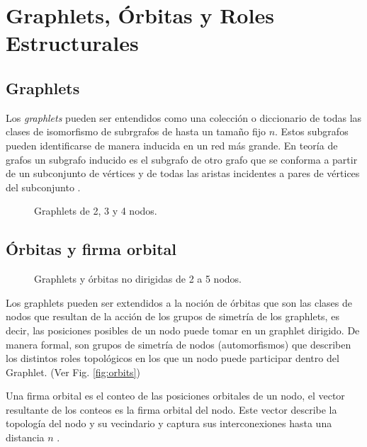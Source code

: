 
\chapter{Graphlets, Órbitas y Roles Estructurales}
\label{chapter:graphlets}

\section{Graphlets}


Los \textit{graphlets} pueden ser entendidos como una colección o diccionario de todas las clases de isomorfismo de subrgrafos de hasta un tamaño fijo $n$. Estos subgrafos pueden identificarse de manera inducida en un red más grande. En teoría de grafos un subgrafo inducido es el subgrafo de otro grafo que se conforma a partir de un subconjunto de vértices y de todas las aristas incidentes a pares de vértices del subconjunto \cite{przulj_biological_2007}.


 \begin{figure}[htbp]
   \centering
   
    \caption{Graphlets de 2, 3 y 4 nodos.}
    \label{fig:small-graphlets}
\end{figure}

\section{Órbitas y firma orbital}

 \begin{figure}[htbp]
   \centering
   
    \caption{Graphlets y órbitas no dirigidas de 2 a 5 nodos.}
    \label{fig:orcaorbits}
\end{figure}

Los graphlets pueden ser extendidos a la noción de órbitas que son las clases de nodos que resultan de la acción de los grupos de simetría de los graphlets, es decir, las posiciones posibles de un nodo puede tomar en un graphlet dirigido. De manera formal, son grupos de simetría de nodos (automorfismos) \cite{sarajlic_graphlet-based_2016} que describen los distintos roles topológicos en los que un nodo puede participar dentro del Graphlet. (Ver Fig. \ref{fig:orbits})

Una firma orbital es el conteo de las posiciones orbitales de un nodo, el vector resultante de los conteos es la firma orbital del nodo. Este vector describe la topología del nodo y su vecindario y captura sus interconexiones hasta una distancia $n$ \cite{sarajlic_graphlet-based_2016}.

